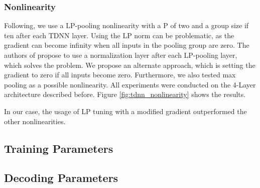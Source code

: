 \subsubsection{Nonlinearity}
Following\cite{zhang2014improving}, we use a LP-pooling nonlinearity with a P of two and a group size if ten after each TDNN layer. Using the LP norm can be problematic, as the gradient can become infinity when all inputs in the pooling group are zero. The authors of \cite{peddinti2015reverberation} propose to use a normalization layer after each LP-pooling layer, which solves the problem. We propose an alternate approach, which is setting the gradient to zero if all inputs become zero. Furthermore, we also tested max pooling as a possible nonlinearity. All experiments were conducted on the 4-Layer architecture described before. Figure \ref{fig:tdnn_nonlinearity} shows the results. 
\begin{minipage}{\linewidth}
	\label{fig:tdnn_nonlinearity}
\end{minipage}
In our case, the usage of LP tuning with a modified gradient outperformed the other nonlinearities.  
\subsection{Training Parameters}

\subsection{Decoding Parameters}



